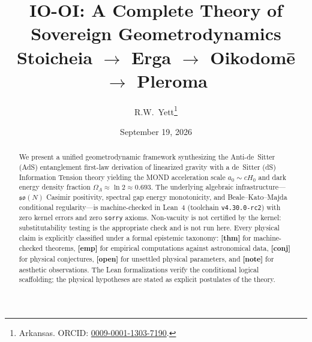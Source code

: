 \documentclass[12pt,letterpaper]{article}
\title{\Large\textbf{IO-OI: A Complete Theory of Sovereign Geometrodynamics}\\[0.2cm]
\large Stoicheia $\longrightarrow$ Erga $\longrightarrow$ Oikodom\={e} $\longrightarrow$ Pleroma}
\author{
R.W.\ Yett\thanks{Arkansas. ORCID: \href{https://orcid.org/0009-0001-1303-7190}{0009-0001-1303-7190}.}
}
\date{September 19, 2026}
\theoremstyle{plain}
\theoremstyle{definition}
\begin{document}
\maketitle



\begin{center}
\end{center}
\bigskip


\begin{abstract}
We present a unified geometrodynamic framework synthesizing the Anti-de~Sitter (AdS) entanglement first-law derivation of linearized gravity with a de~Sitter (dS) Information Tension theory yielding the MOND acceleration scale $a_0 \sim cH_0$ and dark energy density fraction $\Omega_\Lambda \approx \ln 2 \approx 0.693$. The underlying algebraic infrastructure---$\mathfrak{so}(N)$ Casimir positivity, spectral gap energy monotonicity, and Beale--Kato--Majda conditional regularity---is machine-checked in Lean~4 (toolchain \texttt{v4.30.0-rc2}) with zero kernel errors and zero \texttt{sorry} axioms. Non-vacuity is not certified by the kernel: substitutability testing is the appropriate check and is not run here. Every physical claim is explicitly classified under a formal epistemic taxonomy: \textbf{[thm]} for machine-checked theorems, \textbf{[emp]} for empirical computations against astronomical data, \textbf{[conj]} for physical conjectures, \textbf{[open]} for unsettled physical parameters, and \textbf{[note]} for aesthetic observations. The Lean formalizations verify the conditional logical scaffolding; the physical hypotheses are stated as explicit postulates of the theory.
\end{abstract}

\vspace{0.3cm}

\end{document}
